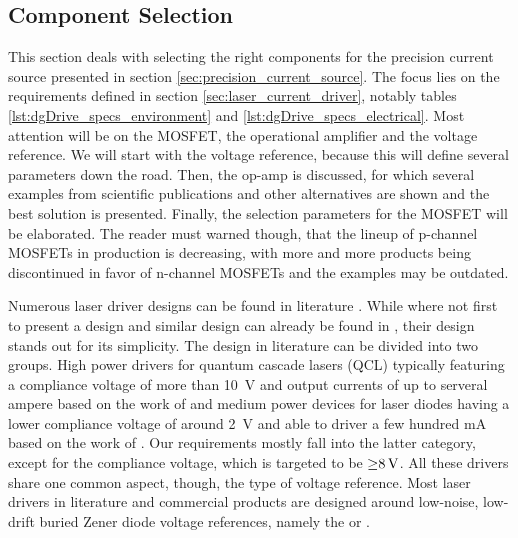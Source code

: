 \subsection{Component Selection}
\label{sec:component_selection}
This section deals with selecting the right components for the precision current source presented in section \ref{sec:precision_current_source}. The focus lies on the requirements defined in section \ref{sec:laser_current_driver}, notably tables \ref{lst:dgDrive_specs_environment} and \ref{lst:dgDrive_specs_electrical}. Most attention will be on the MOSFET, the operational amplifier and the voltage reference. We will start with the voltage reference, because this will define several parameters down the road. Then, the op-amp is discussed, for which several examples from scientific publications and other alternatives are shown and the best solution is presented. Finally, the selection parameters for the MOSFET will be elaborated. The reader must warned though, that the lineup of p-channel MOSFETs in production is decreasing, with more and more products being discontinued in favor of n-channel MOSFETs and the examples may be outdated.

Numerous laser driver designs can be found in literature \cite{libbrecht_hall, laser_driver_mosfet_noise, laser_driver_digital, laser_driver_digital_update, laser_driver_qcl_space, laser_driver_qcl_taubman, laser_driver_qcl_taubman_multiplexer}. While \citeauthor{libbrecht_hall} where not first to present a design and similar design can already be found in \cite{laser_driver_old}, their design stands out for its simplicity. The design in literature can be divided into two groups. High power drivers for quantum cascade lasers (QCL) typically featuring a compliance voltage of more than \qty{10}{\V} and output currents of up to serveral ampere based on the work of \citeauthor{laser_driver_qcl_taubman} and medium power devices for laser diodes having a lower compliance voltage of around \qty{2}{\V} and able to driver a few hundred \unit{\mA} based on the work of \citeauthor{libbrecht_hall}. Our requirements mostly fall into the latter category, except for the compliance voltage, which is targeted to be $\qty{\ge 8}{\V}$. All these drivers share one common aspect, though, the type of voltage reference. Most laser drivers in literature and commercial products are designed around low-noise, low-drift buried Zener diode voltage references, namely the  \cite{datasheet_LM399} or  \cite{datasheet_LTZ1000}.

